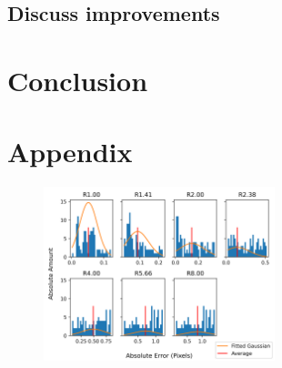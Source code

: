 \documentclass[aps,pra,a4paper,nofootinbib,onecolumn,tightenlines,longbibliography,12pt,amsfonts,amssymb,amsmath,floatfix]{revtex4-2} %
\begin{document}
  \subsection{Discuss improvements} %
  \label{sub:Discuss improvement}



\section{Conclusion} %
\label{sec:Conclusion}




\newpage


\newpage
\appendix

\section{Appendix}


  \begin{figure}[H]
    \begin{center}
      \includegraphics[width=0.6\textwidth]{project_pics/distro_centriod_5.png}
    \end{center}
    \caption{}
    \label{fig:box_5}
  \end{figure}
\end{document}
